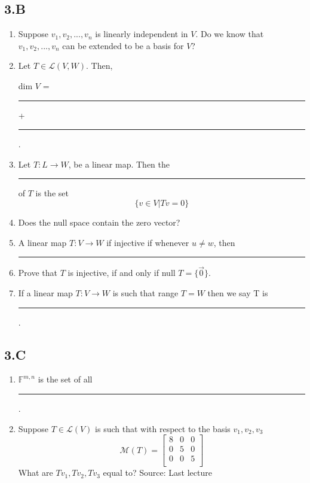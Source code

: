 \documentclass[11pt]{article}
\begin{document}
\subsection*{3.B}
\begin{enumerate}
	\item Suppose $v_1, v_2, ..., v_n$ is linearly independent in $V$. Do we know that $v_1, v_2, ..., v_n$ can be extended to be a basis for $V$?
	
	\item Let $T \in \mathcal{L}(V, W)$. Then,
	
	dim $V$ = \rule[0ex]{0.75in}{0.5pt} + \rule[0ex]{0.75in}{0.5pt}.
	
	\item Let $T: L \rightarrow W$, be a linear map. Then the \rule[0ex]{1.5in}{0.5pt} of $T$ is the set
	\[\{v \in V | Tv = 0\}\]
	
	\item Does the null space contain the zero vector?
	
	\item A linear map $T: V \rightarrow W$ if injective if whenever $u \neq w$, then \rule[0ex]{1in}{0.5pt}
	
	\item Prove that $T$ is injective, if and only if null $T = \{\vec{0}\}$.
	
	\item If a linear map $T: V \rightarrow W$ is such that range $T = W$ then we say T is \rule[0ex]{1.5in}{0.5pt}.
\end{enumerate}
\subsection*{3.C}
\begin{enumerate}
	\item $\mathbb{F}^{m, n}$ is the set of all \rule[0ex]{1in}{0.5pt}.
	\item Suppose $T \in \mathcal{L}(V)$ is such that with respect to the basis $v_1, v_2, v_3$
	\[\mathcal{M}(T) = 
	\begin{bmatrix}
		8 & 0 & 0 \\
		0 & 5 & 0 \\
		0 & 0 & 5 \\
	\end{bmatrix}
	\]
	What are $Tv_1, Tv_2, Tv_3$ equal to?
	Source: Last lecture
\end{enumerate}
\end{document}
